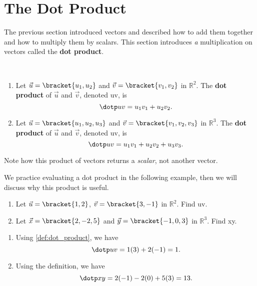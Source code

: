 \section{The Dot Product}\label{sec:dot_product}

The previous section introduced vectors and described how to add them together and how to multiply them by scalars. This section introduces \emph{a} multiplication on vectors called the \textbf{dot product}.

\begin{definition}\label{def:dot_product}
\mbox{}\\[-2\baselineskip]\begin{enumerate}
	\item Let $\vec u =\bracket{u_1,u_2}$ and $\vec v = \bracket{v_1,v_2}$  in $\mathbb{R}^2$. The \textbf{dot product} of $\vec u$ and $\vec v$, denoted \dotp uv, is 
	\[\dotp uv = u_1v_1+u_2v_2.\]
	\item Let $\vec u = \bracket{u_1,u_2,u_3}$ and $\vec v = \bracket{v_1,v_2,v_3}$  in $\mathbb{R}^3$. The \textbf{dot product} of $\vec u$ and $\vec v$, denoted \dotp uv, is 
	\[\dotp uv = u_1v_1+u_2v_2+u_3v_3.\]
\end{enumerate}
\end{definition}

Note how this product of vectors returns a \emph{scalar}, not another vector.

We practice evaluating a dot product in the following example, then we will discuss why this product is useful.

\begin{example}\label{ex_dotp1}
\begin{enumerate}
	\item Let $\vec u=\bracket{1,2}$, $\vec v=\bracket{3,-1}$ in $\mathbb{R}^2$. Find \dotp uv.
	\item Let $\vec x = \bracket{2,-2,5}$ and $\vec y = \bracket{-1, 0, 3}$ in $\mathbb{R}^3$. Find \dotp xy.
\end{enumerate}
\solution
\begin{enumerate}
	\item Using \autoref{def:dot_product}, we have
	\[\dotp uv = 1(3)+2(-1) = 1.\]
	\item	Using the definition, we have
	\[\dotp xy = 2(-1)  -2(0) + 5(3) = 13.\]
\end{enumerate}
\end{example}

